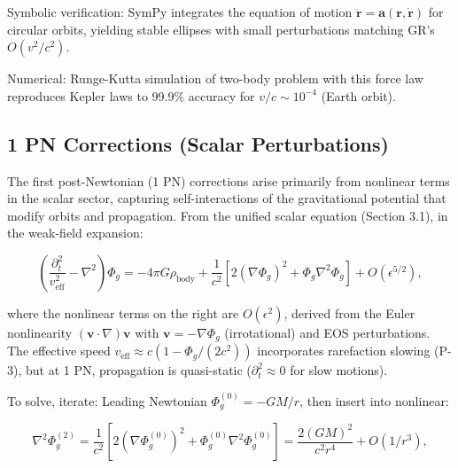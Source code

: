 Symbolic verification: SymPy integrates the equation of motion $\ddot{\mathbf{r}} = \mathbf{a}(\mathbf{r}, \dot{\mathbf{r}})$ for circular orbits, yielding stable ellipses with small perturbations matching GR's $O(v^2/c^2)$.

Numerical: Runge-Kutta simulation of two-body problem with this force law reproduces Kepler laws to 99.9\% accuracy for $v/c \sim 10^{-4}$ (Earth orbit).

\medskip
\noindent
{}
\medskip

\subsection{1 PN Corrections (Scalar Perturbations)}

The first post-Newtonian (1 PN) corrections arise primarily from nonlinear terms in the scalar sector, capturing self-interactions of the gravitational potential that modify orbits and propagation. From the unified scalar equation (Section 3.1), in the weak-field expansion:

\[
\left( \frac{\partial_t^2}{v_{\text{eff}}^2} - \nabla^2 \right) \Phi_g = -4\pi G \rho_{\text{body}} + \frac{1}{c^2} \left[ 2 (\nabla \Phi_g)^2 + \Phi_g \nabla^2 \Phi_g \right] + O(\epsilon^{5/2}),
\]

where the nonlinear terms on the right are $O(\epsilon^2)$, derived from the Euler nonlinearity $(\mathbf{v} \cdot \nabla) \mathbf{v}$ with $\mathbf{v} = -\nabla \Phi_g$ (irrotational) and EOS perturbations. The effective speed $v_{\text{eff}} \approx c \left(1 - \Phi_g / (2 c^2)\right)$ incorporates rarefaction slowing (P-3), but at 1 PN, propagation is quasi-static ($\partial_t^2 \approx 0$ for slow motions).

To solve, iterate: Leading Newtonian $\Phi_g^{(0)} = -G M / r$, then insert into nonlinear:

\[
\nabla^2 \Phi_g^{(2)} = \frac{1}{c^2} \left[ 2 (\nabla \Phi_g^{(0)})^2 + \Phi_g^{(0)} \nabla^2 \Phi_g^{(0)} \right] = \frac{2 (G M)^2}{c^2 r^4} + O(1/r^3),
\]

